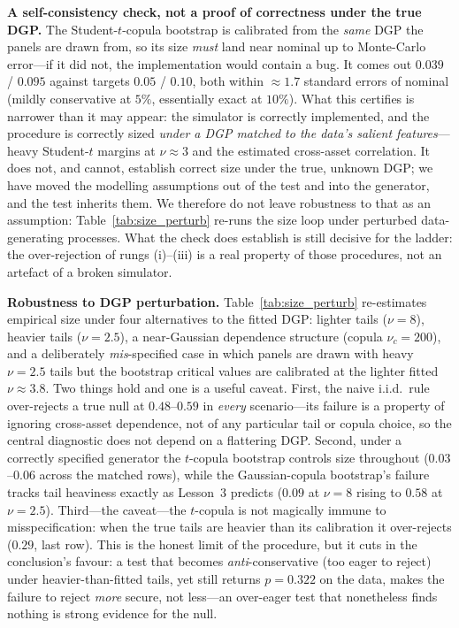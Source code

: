 \documentclass[pdflatex,sn-mathphys-num]{sn-jnl}
\theoremstyle{thmstyleone}
\theoremstyle{thmstyletwo}
\theoremstyle{thmstylethree}
\begin{document}
\textbf{A self-consistency check, not a proof of correctness under the true DGP.} The Student-$t$-copula bootstrap is calibrated from the \emph{same} DGP the panels are drawn from, so its size \emph{must} land near nominal up to Monte-Carlo error---if it did not, the implementation would contain a bug. It comes out $0.039$ / $0.095$ against targets $0.05$ / $0.10$, both within $\approx 1.7$ standard errors of nominal (mildly conservative at $5\%$, essentially exact at $10\%$). What this certifies is narrower than it may appear: the simulator is correctly implemented, and the procedure is correctly sized \emph{under a DGP matched to the data's salient features}---heavy Student-$t$ margins at $\nu\approx 3$ and the estimated cross-asset correlation. It does not, and cannot, establish correct size under the true, unknown DGP; we have moved the modelling assumptions out of the test and into the generator, and the test inherits them. We therefore do not leave robustness to that as an assumption: Table~\ref{tab:size_perturb} re-runs the size loop under perturbed data-generating processes. What the check does establish is still decisive for the ladder: the over-rejection of rungs (i)--(iii) is a real property of those procedures, not an artefact of a broken simulator.

\textbf{Robustness to DGP perturbation.} Table~\ref{tab:size_perturb} re-estimates empirical size under four alternatives to the fitted DGP: lighter tails ($\nu=8$), heavier tails ($\nu=2.5$), a near-Gaussian dependence structure (copula $\nu_c=200$), and a deliberately \emph{mis}-specified case in which panels are drawn with heavy $\nu=2.5$ tails but the bootstrap critical values are calibrated at the lighter fitted $\nu\approx 3.8$. Two things hold and one is a useful caveat. First, the naive i.i.d.\ rule over-rejects a true null at $0.48$--$0.59$ in \emph{every} scenario---its failure is a property of ignoring cross-asset dependence, not of any particular tail or copula choice, so the central diagnostic does not depend on a flattering DGP. Second, under a correctly specified generator the $t$-copula bootstrap controls size throughout ($0.03$--$0.06$ across the matched rows), while the Gaussian-copula bootstrap's failure tracks tail heaviness exactly as Lesson~3 predicts ($0.09$ at $\nu=8$ rising to $0.58$ at $\nu=2.5$). Third---the caveat---the $t$-copula is not magically immune to misspecification: when the true tails are heavier than its calibration it over-rejects ($0.29$, last row). This is the honest limit of the procedure, but it cuts in the conclusion's favour: a test that becomes \emph{anti}-conservative (too eager to reject) under heavier-than-fitted tails, yet still returns $p=0.322$ on the data, makes the failure to reject \emph{more} secure, not less---an over-eager test that nonetheless finds nothing is strong evidence for the null.
\end{document}
